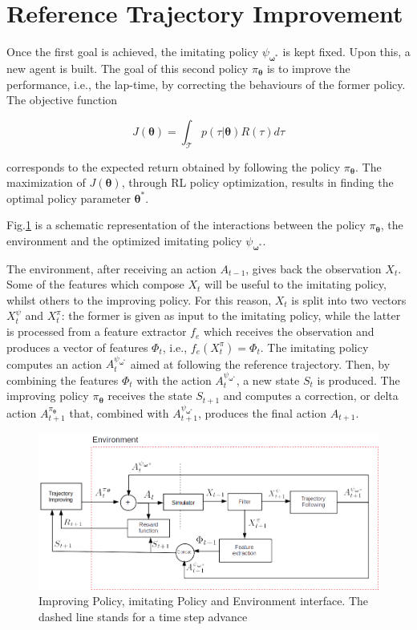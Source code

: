 \section{Reference Trajectory Improvement}
\label{ref_improve}

Once the first goal is achieved, the imitating policy $\psi_{\boldsymbol \omega^*}$ is kept fixed. Upon this, a new agent is built. The goal of this second policy $\pi_{\boldsymbol{\theta}}$ is to improve the performance, i.e., the lap-time, by correcting the behaviours of the former policy. The objective function

\begin{equation}J(\boldsymbol \theta)=\int_{\mathcal{T}} p(\tau|\boldsymbol \theta)R(\tau)d \tau\end{equation}

corresponds to the expected return obtained by following the policy $\pi_{\boldsymbol{\theta}}$. The maximization of $J(\boldsymbol \theta)$, through RL policy optimization, results in finding the optimal policy parameter $\boldsymbol \theta^*$. 


Fig.\ref{fig:diagram3} is a schematic representation of the interactions between the policy $\pi_{\boldsymbol{\theta}}$, the environment and the optimized imitating policy $\psi_{\boldsymbol \omega^*}$.

The environment, after receiving an action $A_{t-1}$, gives back the observation $X_t$. Some of the features which compose $X_t$ will be useful to the imitating policy, whilst others to the improving policy. For this reason, $X_t$ is split into two vectors $X_t^{\psi}$ and $X_t^{\pi}$: the former is given as input to the imitating policy, while the latter is processed from a feature extractor $f_e$ which receives the observation and produces a vector of features $\Phi_t$, i.e., $f_e(X_t^{\pi})= \Phi_t.$
The imitating policy computes an action $A_t^{\psi_{\boldsymbol \omega^*}}$ aimed at following the reference trajectory.
Then, by combining the features $\Phi_t$ with the action $A_t^{\psi_{\boldsymbol \omega^*}}$, a new state $S_t$ is produced.
The improving policy $\pi_{\boldsymbol{\theta}}$ receives the state $S_{t+1}$ and computes a correction, or delta action $A_{t+1}^{\pi_{\boldsymbol{\theta}}}$ that, combined with $A_{t+1}^{\psi_{\boldsymbol \omega^*}}$, produces the final action $A_{t+1}$.


\begin{figure}
    \centering
 	  \captionsetup{width=10cm}
      \includegraphics[width=14cm]{./img/diagram_new}
     \caption{Improving Policy, imitating Policy and Environment interface. The dashed line stands for a time step advance}
   \label{fig:diagram3}
  \end{figure}